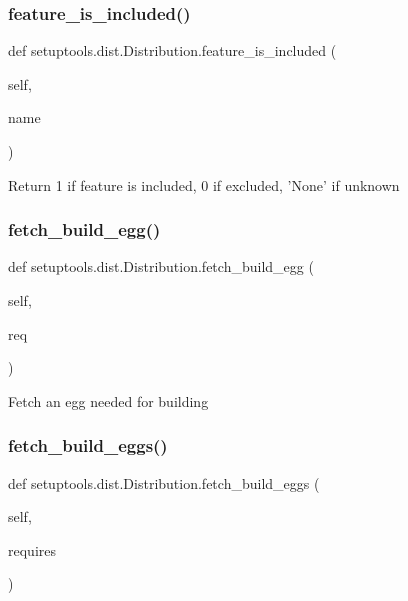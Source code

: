 \subsubsection{\texorpdfstring{feature\+\_\+is\+\_\+included()}{feature\_is\_included()}}
{\footnotesize\ttfamily def setuptools.\+dist.\+Distribution.\+feature\+\_\+is\+\_\+included (\begin{DoxyParamCaption}\item[{}]{self,  }\item[{}]{name }\end{DoxyParamCaption})}

\begin{DoxyVerb}Return 1 if feature is included, 0 if excluded, 'None' if unknown\end{DoxyVerb}
 \mbox{\label{classsetuptools_1_1dist_1_1_distribution_a17bce0b77bfb0a4d06aa9422f1e5e0bf}} 
\subsubsection{\texorpdfstring{fetch\+\_\+build\+\_\+egg()}{fetch\_build\_egg()}}
{\footnotesize\ttfamily def setuptools.\+dist.\+Distribution.\+fetch\+\_\+build\+\_\+egg (\begin{DoxyParamCaption}\item[{}]{self,  }\item[{}]{req }\end{DoxyParamCaption})}

\begin{DoxyVerb}Fetch an egg needed for building\end{DoxyVerb}
 \mbox{\label{classsetuptools_1_1dist_1_1_distribution_a3af6e048cd20731f68583089c6b06b57}} 
\subsubsection{\texorpdfstring{fetch\+\_\+build\+\_\+eggs()}{fetch\_build\_eggs()}}
{\footnotesize\ttfamily def setuptools.\+dist.\+Distribution.\+fetch\+\_\+build\+\_\+eggs (\begin{DoxyParamCaption}\item[{}]{self,  }\item[{}]{requires }\end{DoxyParamCaption})}

